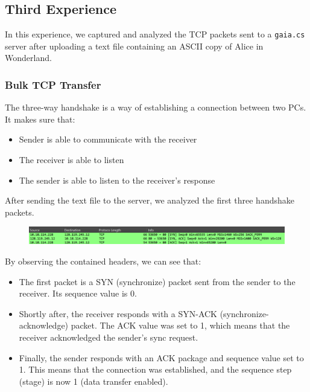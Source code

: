 \subsection{Third Experience}

In this experience, we captured and analyzed the TCP packets sent to a
\texttt{gaia.cs} server after uploading a text file containing an ASCII copy of
Alice in Wonderland.

\subsubsection{Bulk TCP Transfer}

The three-way handshake is a way of establishing a connection between two PCs.
It makes sure that:

\begin{itemize}
    \item Sender is able to communicate with the receiver
    \item The receiver is able to listen
    \item The sender is able to listen to the receiver's response
\end{itemize}

After sending the text file to the server, we analyzed the first three
handshake packets.

\begin{figure}[htbp]
    \centering
    \includegraphics[width=1\linewidth]{img/third_experience/1.png}
    \caption{}\label{fig:3_1}
\end{figure}

By observing the contained headers, we can see that:

\begin{itemize}
    \item The first packet is a SYN (synchronize) packet sent from the sender to the
          receiver. Its sequence value is 0.
    \item Shortly after, the receiver responds with a SYN-ACK (synchronize-acknowledge)
          packet. The ACK value was set to 1, which means that the receiver acknowledged
          the sender's sync request.
    \item Finally, the sender responds with an ACK package and sequence value set to 1.
          This means that the connection was established, and the sequence step (stage)
          is now 1 (data transfer enabled).
\end{itemize}


